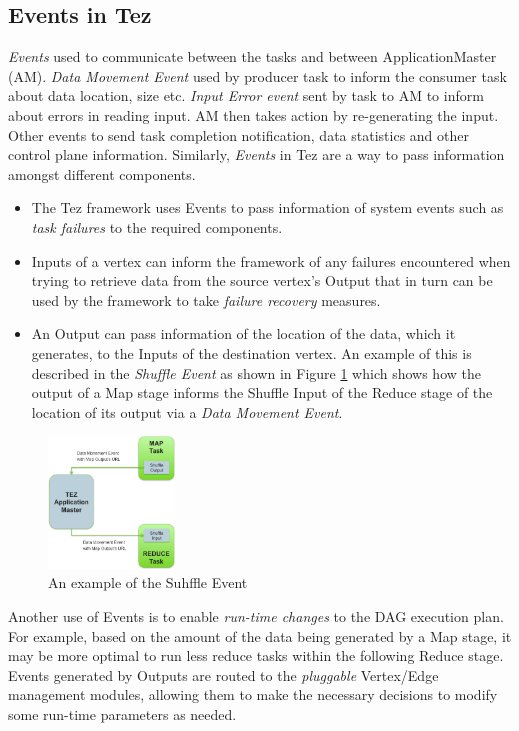 \documentclass[twocolumn]{article}
\begin{document}
\subsection{Events in Tez}

\textit{Events} used to communicate between the tasks and between ApplicationMaster (AM). 
\textit{Data Movement Event} used by producer task to inform the consumer task about data location, size etc.
\textit{Input Error event }sent by task to AM to inform about errors in reading input. AM then takes action by re-generating the input. Other events to send task completion notification, data statistics and other control plane information.
Similarly, \emph{Events} in Tez are a way to pass information amongst different components.

\begin{itemize}
\item
  The Tez framework uses Events to pass information of system events
  such as \emph{task failures} to the required components.
\item
  Inputs of a vertex can inform the framework of any failures
  encountered when trying to retrieve data from the source vertex's
  Output that in turn can be used by the framework to take \textit{failure
  recovery} measures.
\item
  An Output can pass information of the location of the data, which it
  generates, to the Inputs of the destination vertex. An example of this
  is described in the \textit{Shuffle Event} as shown in Figure \ref{fig12} which shows how the output
  of a Map stage informs the Shuffle Input of the Reduce stage of the
  location of its output via a \textit{Data Movement Event}.
\end{itemize}

\begin{figure}[htb]
        \centering
        \includegraphics[width=0.3\textwidth]{tez22}
        \caption{An example of the Suhffle Event}
        \label{fig12}
\end{figure}

Another use of Events is to enable \textit{run-time changes} to the DAG execution
plan. For example, based on the amount of the data being generated by a
Map stage, it may be more optimal to run less reduce tasks within the
following Reduce stage. Events generated by Outputs are routed to the
\textit{pluggable} Vertex/Edge management modules, allowing them to make the
necessary decisions to modify some run-time parameters as needed.
\end{document}
